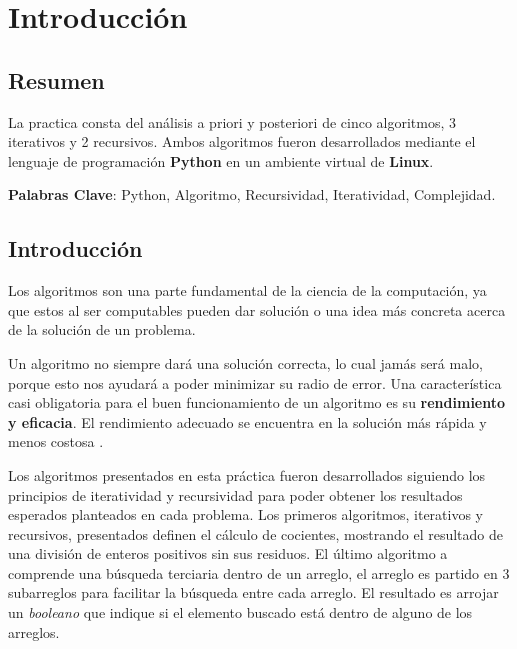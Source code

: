 
\chapter{Introducción}



\section{Resumen}
    La practica consta del análisis a priori y posteriori de cinco algoritmos, 3 iterativos y 2 recursivos. Ambos algoritmos fueron desarrollados mediante el lenguaje de programación \textbf{Python} en un ambiente virtual de \textbf{Linux}.

    \textbf{Palabras Clave}: Python, Algoritmo, Recursividad, Iteratividad, Complejidad. 

\section{Introducción}
    Los algoritmos son una parte fundamental de la ciencia de la computación, ya que estos al ser computables pueden dar solución o una idea más concreta acerca de la solución de un problema.
    
    Un algoritmo no siempre dará una solución correcta, lo cual jamás será malo, porque esto nos ayudará a poder minimizar su radio de error. Una característica casi obligatoria para el buen funcionamiento de un algoritmo es su \textbf{rendimiento y eficacia}. El rendimiento adecuado se encuentra en la solución más rápida y menos costosa \cite{Algorithm}.
    
    Los algoritmos presentados en esta práctica fueron desarrollados siguiendo los principios de iteratividad y recursividad para poder obtener los resultados esperados planteados en cada problema. Los primeros algoritmos, iterativos y recursivos, presentados definen el cálculo de cocientes, mostrando el resultado de una división de enteros positivos sin sus residuos. 
    El último algoritmo a comprende una búsqueda terciaria dentro de un arreglo, el arreglo es partido en 3 subarreglos para facilitar la búsqueda entre cada arreglo. El resultado es arrojar un \textit{booleano} que indique si el elemento buscado está dentro de alguno de los arreglos.
